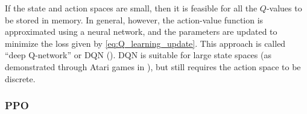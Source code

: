 If the state and action spaces are small, then it is feasible for all the $Q$-values to be stored in memory. In general, however, the action-value function is approximated using a neural network, and the parameters are updated to minimize the loss given by \ref{eq:Q_learning_update}. This approach is called ``deep Q-network'' or DQN (\cite{mnih2013playing}). DQN is suitable for large state spaces (as demonstrated through Atari games in \cite{mnih2013playing}), but still requires the action space to be discrete.

%

\subsubsection{PPO}

